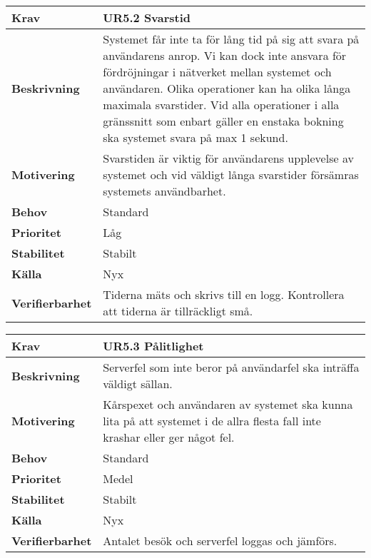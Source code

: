 \documentclass[a4paper, twoside, 11pt, titlepage]{article}
\begin{document}
		\begin{tabular} { p{2.6cm} p{12.5cm} }
			\hline
			\sffamily\textbf{Krav} & \sffamily\textbf{UR5.2 Svarstid } \\
			\hline
			\sffamily\textbf{Beskrivning} & Systemet får inte ta för lång tid på sig att svara på användarens anrop. Vi kan dock inte ansvara för fördröjningar i nätverket mellan systemet och användaren. Olika operationer kan ha olika långa maximala svarstider. Vid alla operationer i alla gränssnitt som enbart gäller en enstaka bokning ska systemet svara på max 1 sekund.  \\
			\hline
			\sffamily\textbf{Motivering} & Svarstiden är viktig för användarens upplevelse av systemet och vid väldigt långa svarstider försämras systemets användbarhet.  \\
			\hline
			\sffamily\textbf{Behov} & Standard  \\
			\hline
			\sffamily\textbf{Prioritet} & Låg  \\
			\hline
			\sffamily\textbf{Stabilitet} & Stabilt  \\
			\hline
			\sffamily\textbf{Källa} & Nyx  \\
			\hline
			\sffamily\textbf{Verifierbarhet} & Tiderna mäts och skrivs till en logg. Kontrollera att tiderna är tillräckligt små.  \\
			\hline
		\end{tabular}
		\vspace{6mm}

		\begin{tabular} { p{2.6cm} p{12.5cm} }
			\hline
			\sffamily\textbf{Krav} & \sffamily\textbf{UR5.3 Pålitlighet } \\
			\hline
			\sffamily\textbf{Beskrivning} & Serverfel som inte beror på användarfel ska inträffa väldigt sällan.  \\
			\hline
			\sffamily\textbf{Motivering} & Kårspexet och användaren av systemet ska kunna lita på att systemet i de allra flesta fall inte krashar eller ger något fel.  \\
			\hline
			\sffamily\textbf{Behov} & Standard  \\
			\hline
			\sffamily\textbf{Prioritet} & Medel  \\
			\hline
			\sffamily\textbf{Stabilitet} & Stabilt  \\
			\hline
			\sffamily\textbf{Källa} & Nyx  \\
			\hline
			\sffamily\textbf{Verifierbarhet} & Antalet besök och serverfel loggas och jämförs.  \\
			\hline
		\end{tabular}
		\vspace{6mm}
\end{document}
